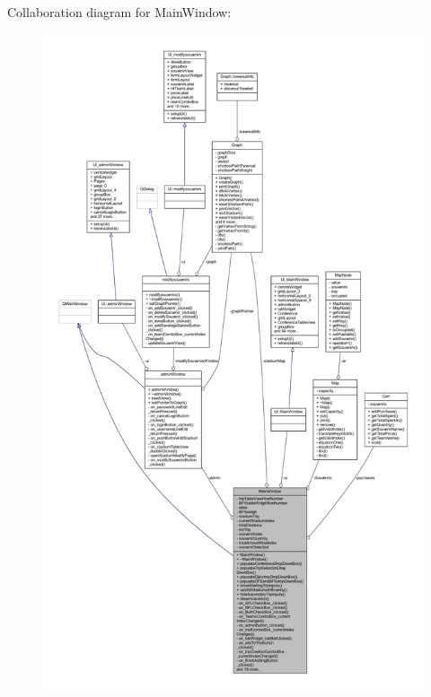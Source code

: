 Collaboration diagram for Main\+Window\+:
\nopagebreak
\begin{figure}[H]
\begin{center}
\leavevmode
\includegraphics[height=550pt]{class_main_window__coll__graph}
\end{center}
\end{figure}
